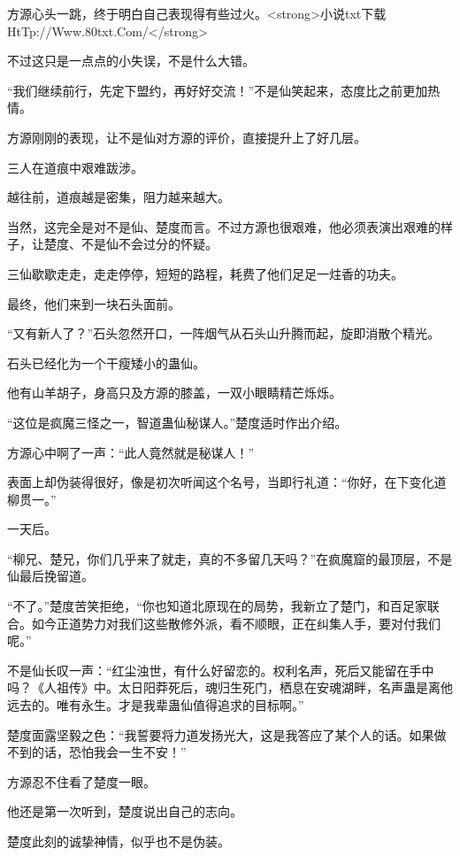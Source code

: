 
\begin{this_body}

方源心头一跳，终于明白自己表现得有些过火。<strong>小说txt下载HtTp://Www.80txt.Com/</strong>

不过这只是一点点的小失误，不是什么大错。

“我们继续前行，先定下盟约，再好好交流！”不是仙笑起来，态度比之前更加热情。

方源刚刚的表现，让不是仙对方源的评价，直接提升上了好几层。

三人在道痕中艰难跋涉。

越往前，道痕越是密集，阻力越来越大。

当然，这完全是对不是仙、楚度而言。不过方源也很艰难，他必须表演出艰难的样子，让楚度、不是仙不会过分的怀疑。

三仙歇歇走走，走走停停，短短的路程，耗费了他们足足一炷香的功夫。

最终，他们来到一块石头面前。

“又有新人了？”石头忽然开口，一阵烟气从石头山升腾而起，旋即消散个精光。

石头已经化为一个干瘦矮小的蛊仙。

他有山羊胡子，身高只及方源的膝盖，一双小眼睛精芒烁烁。

“这位是疯魔三怪之一，智道蛊仙秘谋人。”楚度适时作出介绍。

方源心中啊了一声：“此人竟然就是秘谋人！”

表面上却伪装得很好，像是初次听闻这个名号，当即行礼道：“你好，在下变化道柳贯一。”

一天后。

“柳兄、楚兄，你们几乎来了就走，真的不多留几天吗？”在疯魔窟的最顶层，不是仙最后挽留道。

“不了。”楚度苦笑拒绝，“你也知道北原现在的局势，我新立了楚门，和百足家联合。如今正道势力对我们这些散修外派，看不顺眼，正在纠集人手，要对付我们呢。”

不是仙长叹一声：“红尘浊世，有什么好留恋的。权利名声，死后又能留在手中吗？《人祖传》中。太日阳莽死后，魂归生死门，栖息在安魂湖畔，名声蛊是离他远去的。唯有永生。才是我辈蛊仙值得追求的目标啊。”

楚度面露坚毅之色：“我誓要将力道发扬光大，这是我答应了某个人的话。如果做不到的话，恐怕我会一生不安！”

方源忍不住看了楚度一眼。

他还是第一次听到，楚度说出自己的志向。

楚度此刻的诚挚神情，似乎也不是伪装。


\end{this_body}

